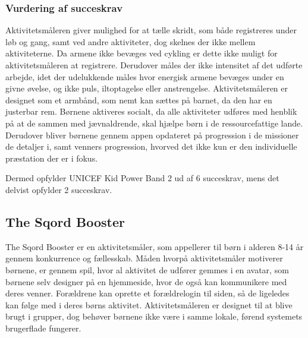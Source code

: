 
\subsubsection{Vurdering af succeskrav}
Aktivitetsmåleren giver mulighed for at tælle skridt, som både registreres under løb og gang, samt ved andre aktiviteter, dog skelnes der ikke mellem aktiviteterne. Da armene ikke bevæges ved cykling er dette ikke muligt for aktivitetsmåleren at registrere. Derudover måles der ikke intensitet af det udførte arbejde, idet der udelukkende måles hvor energisk armene bevæges under en givne øvelse, og ikke puls, iltoptagelse eller anstrengelse. Aktivitetsmåleren er designet som et armbånd, som nemt kan sættes på barnet, da den har en justerbar rem. \citep{PowerManual2015} \newline
Børnene aktiveres socialt, da alle aktiviteter udføres med henblik på at de sammen med jævnaldrende, skal hjælpe børn i de ressourcefattige lande. Derudover bliver børnene gennem appen opdateret på progression i de missioner de detaljer i, samt venners progression, hvorved det ikke kun er den individuelle præstation der er i fokus. %
\citep{PowerAbout2015}

Dermed opfylder UNICEF Kid Power Band 2 ud af 6 succeskrav, mens det delvist opfylder 2 succeskrav.

\subsection{The Sqord Booster}
The Sqord Booster er en aktivitetsmåler, som appellerer til børn i alderen 8-14 år gennem konkurrence og fællesskab. Måden hvorpå aktivitetsmåler motiverer børnene, er gennem spil, hvor al aktivitet de udfører gemmes i en avatar, som børnene selv designer på en hjemmeside, hvor de også kan kommunikere med deres venner. Forældrene kan oprette et forældrelogin til siden, så de ligeledes kan følge med i deres børns aktivitet. Aktivitetsmåleren er designet til at blive brugt i grupper, dog behøver børnene ikke være i samme lokale, førend systemets brugerflade fungerer. \citep{Sqord_family2015}

